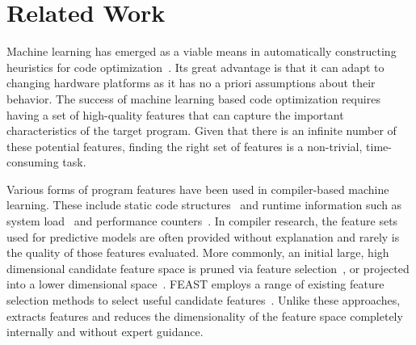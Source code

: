 \section{Related Work} \label{sec:rw}



Machine learning has emerged as a viable means in automatically constructing heuristics for code optimization~\cite{Stephenson2005,Agakov,Wang2010,Kulkarni2012,Ding2015,Muralidharan2016}. Its great advantage is that it can adapt to changing hardware platforms as it has no a priori assumptions about their behavior. The success of machine learning based code optimization requires having a set of high-quality features that can capture the important characteristics of the target program. Given that there is an infinite number of these potential features, finding the right set of features is a non-trivial, time-consuming task. 


Various forms of program features have been used in compiler-based machine learning. These include static code structures~\cite{Jiang2010} and runtime information such as system load~\cite{Wen2015} and performance counters~\cite{Dubach2009}. In compiler research, the feature sets used for predictive models are often provided without explanation and rarely is the quality of those features evaluated. More commonly, an initial large, high dimensional candidate feature space is pruned via feature selection~\cite{Stephenson2005}, or projected into a lower dimensional space~\cite{Collins2013,Dubach2007}. FEAST employs a range of existing feature selection methods to select useful candidate features~\cite{Ting2016}. Unlike these approaches, \DeepTune extracts features and reduces the dimensionality of the feature space completely internally and without expert guidance. 

